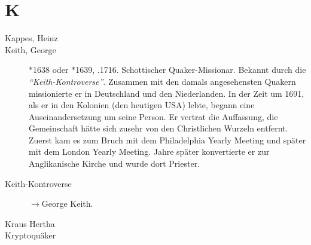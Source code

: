 \section*{K}

\articlesize

\begin{description}

\item[Kappes, Heinz]

 \item[Keith, George] $\ast$1638 oder $\ast$1639, .1716. Schottischer Quaker-Missionar. Bekannt durch die \textit{"`Keith-Kontroverse"'}. Zusammen mit den damals angesehensten Quakern missionierte er in Deutschland und den Niederlanden. In der Zeit um 1691, als er in den Kolonien (den heutigen USA) lebte, begann eine Auseinandersetzung um seine Person. Er vertrat die Auffassung, die Gemeinschaft hätte sich zusehr von den Christlichen Wurzeln entfernt. Zuerst kam es zum Bruch mit dem Philadelphia Yearly Meeting und später mit dem London Yearly Meeting. Jahre später konvertierte er zur Anglikanische Kirche und wurde dort Priester.

 \item[Keith-Kontroverse] $\to$George Keith.

 \item[Kraus Hertha]

 \item[Kryptoquäker]

 \end{description}
\normalsize
